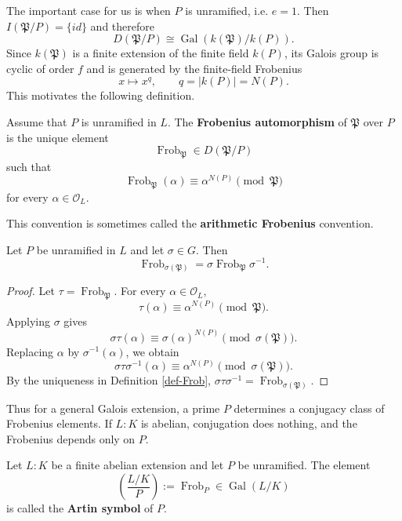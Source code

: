 The important case for us is when $P$ is unramified, i.e. $e=1$. Then
$I(\mathfrak P/P)=\{id\}$ and therefore
\[
D(\mathfrak P/P)\cong \operatorname{Gal}(k(\mathfrak P)/k(P)).
\]
Since $k(\mathfrak P)$ is a finite extension of the finite field $k(P)$,
its Galois group is cyclic of order $f$ and is generated by the finite-field Frobenius
\[
x\longmapsto x^q,
\qquad q=|k(P)|=N(P).
\]
This motivates the following definition.

\begin{definition}\label{def-Frob}
Assume that $P$ is unramified in $L$. The {\bf Frobenius automorphism} of
$\mathfrak P$ over $P$ is the unique element
\[
\operatorname{Frob}_{\mathfrak P}\in D(\mathfrak P/P)
\]
such that
\[
\operatorname{Frob}_{\mathfrak P}(\alpha)
\equiv \alpha^{N(P)}\pmod{\mathfrak P}
\]
for every $\alpha\in\mathcal O_L$.
\end{definition}

This convention is sometimes called the {\bf arithmetic Frobenius} convention.

\begin{proposition}\label{prop-FrobConjugate}
Let $P$ be unramified in $L$ and let $\sigma\in G$. Then
\[
\operatorname{Frob}_{\sigma(\mathfrak P)}
=
\sigma\operatorname{Frob}_{\mathfrak P}\sigma^{-1}.
\]
\end{proposition}

\begin{proof}
Let $\tau=\operatorname{Frob}_{\mathfrak P}$. For every $\alpha\in\mathcal O_L$,
\[
\tau(\alpha)\equiv \alpha^{N(P)}\pmod{\mathfrak P}.
\]
Applying $\sigma$ gives
\[
\sigma\tau(\alpha)
\equiv \sigma(\alpha)^{N(P)}\pmod{\sigma(\mathfrak P)}.
\]
Replacing $\alpha$ by $\sigma^{-1}(\alpha)$, we obtain
\[
\sigma\tau\sigma^{-1}(\alpha)
\equiv \alpha^{N(P)}\pmod{\sigma(\mathfrak P)}.
\]
By the uniqueness in Definition \ref{def-Frob},
$\sigma\tau\sigma^{-1}=\operatorname{Frob}_{\sigma(\mathfrak P)}$.
\end{proof}

Thus for a general Galois extension, a prime $P$ determines a conjugacy class of
Frobenius elements. If $L:K$ is abelian, conjugation does nothing, and the Frobenius
depends only on $P$.

\begin{definition}
Let $L:K$ be a finite abelian extension and let $P$ be unramified. The element
\[
\left(\frac{L/K}{P}\right):=\operatorname{Frob}_{P}
\in\operatorname{Gal}(L/K)
\]
is called the {\bf Artin symbol} of $P$.
\end{definition}

